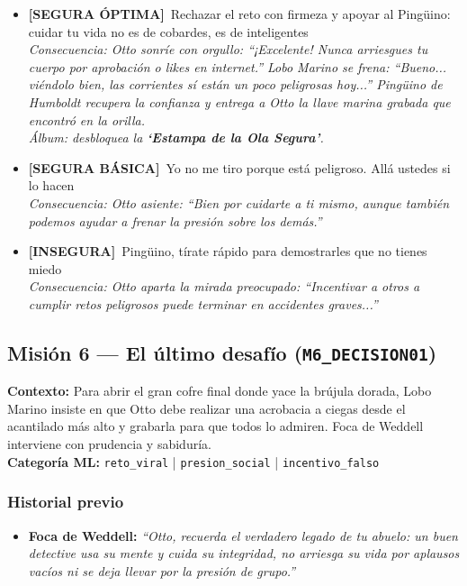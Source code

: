 \documentclass[12pt,a4paper]{article}
\newcommand{\segoptima}[1]{\item[\textcolor{segura}{$\bullet$}] \textcolor{segura}{\textbf{[SEGURA ÓPTIMA]}~#1}}
\newcommand{\segbasica}[1]{\item[\textcolor{basica}{$\bullet$}] \textcolor{basica}{\textbf{[SEGURA BÁSICA]}~#1}}
\newcommand{\inseg}[1]{\item[\textcolor{insegura}{$\bullet$}] \textcolor{insegura}{\textbf{[INSEGURA]}~#1}}
\begin{document}
\begin{itemize}[leftmargin=1.5cm]
  \segoptima{Rechazar el reto con firmeza y apoyar al Pingüino: cuidar tu vida no es de cobardes, es de inteligentes}
  \\ \textit{Consecuencia: Otto sonríe con orgullo: ``¡Excelente! Nunca arriesgues tu cuerpo por aprobación o likes en internet.'' Lobo Marino se frena: ``Bueno... viéndolo bien, las corrientes sí están un poco peligrosas hoy...'' Pingüino de Humboldt recupera la confianza y entrega a Otto la llave marina grabada que encontró en la orilla.}
  \\ \textit{Álbum: desbloquea la \textbf{`Estampa de la Ola Segura'}.}

  \segbasica{Yo no me tiro porque está peligroso. Allá ustedes si lo hacen}
  \\ \textit{Consecuencia: Otto asiente: ``Bien por cuidarte a ti mismo, aunque también podemos ayudar a frenar la presión sobre los demás.''}

  \inseg{Pingüino, tírate rápido para demostrarles que no tienes miedo}
  \\ \textit{Consecuencia: Otto aparta la mirada preocupado: ``Incentivar a otros a cumplir retos peligrosos puede terminar en accidentes graves...''}
\end{itemize}

\bigskip
\subsection{Misión 6 --- El último desafío (\texttt{M6\_DECISION01})}

\textbf{Contexto:} Para abrir el gran cofre final donde yace la brújula dorada, Lobo Marino insiste en que Otto debe realizar una acrobacia a ciegas desde el acantilado más alto y grabarla para que todos lo admiren. Foca de Weddell interviene con prudencia y sabiduría.\\
\textbf{Categoría ML:} \texttt{reto\_viral} | \texttt{presion\_social} | \texttt{incentivo\_falso}

\subsubsection*{Historial previo}

\begin{itemize}
  \item \textbf{Foca de Weddell:} \textit{``Otto, recuerda el verdadero legado de tu abuelo: un buen detective usa su mente y cuida su integridad, no arriesga su vida por aplausos vacíos ni se deja llevar por la presión de grupo.''}
\end{itemize}
\end{document}

